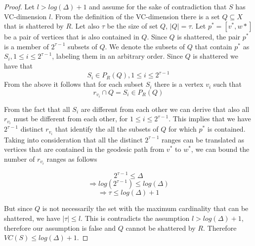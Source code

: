 \begin{proof}
Let $l>log(\Delta)+1$ and assume for the sake of contradiction that $S$ has VC-dimension $l$. 
From the definition of the VC-dimension there is a set $Q\subseteq X$ that is shattered by $R$.
Let also $\tau$ be the size of set $Q$, $|Q|=\tau$.
Let $p^{*}=[v^{*},w{*}]$ be a pair of vertices  that is also contained in $Q$.
Since $Q$ is shattered, the pair $p^{*}$ is a member of $2^{\tau-1}$ subsets of $Q$.
We denote the subsets of $Q$ that contain $p^{*}$ as $S_{i},1\leq i \leq 2^{\tau-1}$, labeling them in an arbitrary order.
Since $Q$ is shattered we have that
\begin{displaymath}
S_{i}\in P_{R}(Q), 1\leq i \leq 2^{\tau-1}
\end{displaymath}
From the above it follows that for each subset $S_{i}$ there is a vertex $v_{i}$ such that
\begin{displaymath}
r_{v_{i}}\cap Q = S_{i}\in P_{R}(Q)
\end{displaymath}

From the fact that all $S_{i}$ are different from each other we can derive that also all $r_{v_{i}}$ must be different from each other, for $1\leq i \leq 2^{\tau-1}$.
This implies that we have $2^{\tau-1}$ distinct $r_{v_{i}}$ that identify the all the subsets of $Q$ for which $p^{*}$ is contained.
Taking into consideration that all the distinct $2^{\tau-1}$ ranges can be translated as vertices that are contained in the geodesic path from $v^{*}$ to $w^{*}$, we can bound the number of $r_{v_{i}}$ ranges as follows

\begin{displaymath}
2^{\tau-1}\leq \Delta
\end{displaymath}
\begin{displaymath}
\Rightarrow log(2^{\tau-1})\leq log(\Delta)
\end{displaymath}
\begin{displaymath}
\Rightarrow \tau\leq log(\Delta)+1
\end{displaymath}

But since $Q$ is not necessarily the set with the maximum cardinality that can be shattered, we have $|\tau|\leq l$.
This is contradicts the assumption $l>log(\Delta)+1$, therefore our assumption is false and $Q$ cannot be shattered by $R$.
Therefore $VC(S)\leq log(\Delta)+1$.
\end{proof}

